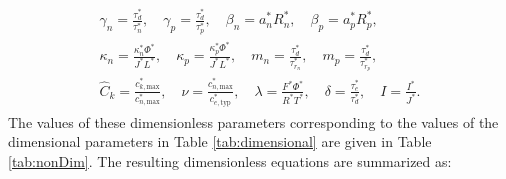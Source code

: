\documentclass[preprint]{elsarticle}
\begin{document}
\begin{gather} 
	\begin{split}
	\gamma_n = \frac{\tau_d^*}{\tau_n^*}, \quad \gamma_p = \frac{\tau_d^*}{\tau_p^*}, \quad \beta_n = a_n^*R_n^*, \quad \beta_p = a_p^*R_p^*, \\ 
    \kappa_n = \frac{\kappa_n^* \Phi^*}{J^* L^*}, \quad \kappa_p = \frac{\kappa_p^* \Phi^*}{J^* L^*}, \quad m_n =\frac{\tau_d^*}{\tau_{r_n}^*}, \quad m_p =\frac{\tau_d^*}{\tau_{r_p}^*}, \\ 
    \hat{C}_k=\frac{c_{k,\text{max}}^*}{c_{n,\text{max}}^*}, \quad \nu=\frac{c_{n,\text{max}}^*}{c_{e,\text{typ}}^*}, \quad \lambda=\frac{F^* \Phi^*}{R^* T^*}, \quad \delta = \frac{\tau_e^*}{\tau_{d}^*}, \quad I=\frac{I^*}{J^*}.
    \end{split}
\end{gather}
The values of these dimensionless parameters corresponding to the values of the dimensional parameters in Table \ref{tab:dimensional} are given in Table \ref{tab:nonDim}. The resulting dimensionless equations are summarized as: 
\end{document}

